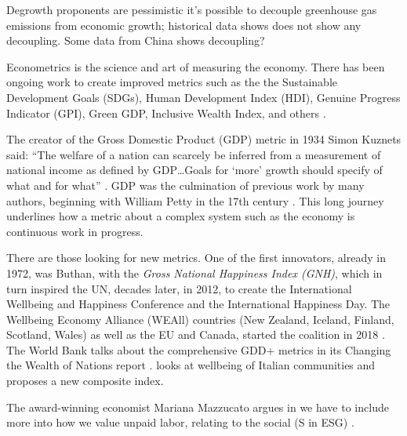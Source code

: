 \documentclass[
  letterpaper,
  DIV=11,
  numbers=noendperiod]{scrartcl}
\begin{document}
Degrowth proponents are pessimistic it's possible to decouple greenhouse
gas emissions from economic growth; historical data shows does not show
any decoupling. Some data from China shows decoupling?

Econometrics is the science and art of measuring the economy. There has
been ongoing work to create improved metrics such as the the Sustainable
Development Goals (SDGs), Human Development Index (HDI), Genuine
Progress Indicator (GPI), Green GDP, Inclusive Wealth Index, and others
\citep{bleysBarriersOpportunitiesAlternative2015, kovacicGDPIndicatorsNeed2015, anielskiMeasuringSustainabilityNations2001}.

The creator of the Gross Domestic Product (GDP) metric in 1934 Simon
Kuznets said: ``The welfare of a nation can scarcely be inferred from a
measurement of national income as defined by GDP\ldots Goals for `more'
growth should specify of what and for what''
\citep{unitedstates.bureauofforeignanddomesticcommerceNationalIncome192919321934}.
GDP was the culmination of previous work by many authors, beginning with
William Petty in the 17th century \citet{rockoffGoodStartNBER2020}. This
long journey underlines how a metric about a complex system such as the
economy is continuous work in progress.

There are those looking for new metrics. One of the first innovators,
already in 1972, was Buthan, with the \emph{Gross National Happiness
Index (GNH)}, which in turn inspired the UN, decades later, in 2012, to
create the International Wellbeing and Happiness Conference and the
International Happiness
Day\citep{ribeiroGrossNationalHappiness2017, kameiUrbanizationCarbonNeutrality2021}.
The Wellbeing Economy Alliance (WEAll) countries (New Zealand, Iceland,
Finland, Scotland, Wales) as well as the EU and Canada, started the
coalition in 2018
\citep{ellsmoorNewZealandDitches2019, davidsuzukifoundationWellbeingEconomies2021, ceprFairSustainableProsperous2022, scottishgovernmentWellbeingEconomyGovernments2022, wellbeingeconomyallianceWhatWellbeingEconomy2022}.
The World Bank talks about the comprehensive GDD+ metrics in its
Changing the Wealth of Nations report
\citep{worldbankChangingWealthNations2021}.
\citet{giacaloneWellbeingAnalysisItalian2022} looks at wellbeing of
Italian communities and proposes a new composite index.

The award-winning economist Mariana Mazzucato argues in
\citet{guptaElectrifyingEconomistGuide2020} we have to include more into
how we value unpaid labor, relating to the social (S in ESG)
\citep{mazzucatoValueEverythingMaking2018}.
\end{document}

